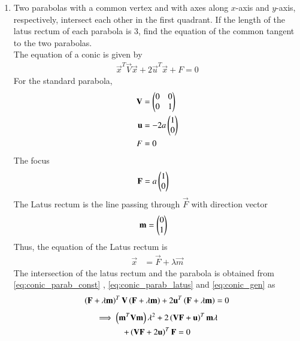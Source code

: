 \renewcommand{\theequation}{\theenumi}
\begin{enumerate}[label=\arabic*.,ref=\thesubsection.\theenumi]
\item Two parabolas with a common vertex and with axes along $x$-axis and $y$-axis, respectively, intersect 
each other in the first quadrant.  If the length of the latus rectum of each parabola is 3, find the equation 
of the common tangent to the two parabolas.
\\
\solution The equation of a conic is given by 
%
\begin{align}
\label{eq:conic_gen}
\vec{x}^T\vec{V}\vec{x}+2\vec{u}^T\vec{x}+F=0
\end{align}
%
For the standard parabola, 
\begin{align}
\label{eq:conic_parab_V}
\mathbf{V}&=\begin{pmatrix}0 & 0 \\ 0& 1\end{pmatrix}
\\
\mathbf{u}&=-2a\begin{pmatrix}1 \\ 0\end{pmatrix}
\label{eq:conic_parab_u}
\\
F&=0
\label{eq:conic_parab_const}
\end{align}
%
The focus
\begin{align}
\label{eq:conic_parab_focus}
\mathbf{F}&=a\begin{pmatrix}1 \\ 0\end{pmatrix}
\end{align}
%
The Latus rectum is the line passing through $\vec{F}$ with direction vector 
\begin{align}
\label{eq:conic_parab_latus_m}
\mathbf{m}&=\begin{pmatrix}0 \\ 1\end{pmatrix}
\end{align}
%
Thus, the equation of the Latus rectum is 
\begin{align}
\label{eq:conic_parab_latus}
\vec{x}&= \vec{F}+\lambda \vec{m}
\end{align}
%
The intersection of the latus rectum and the parabola is obtained from \eqref{eq:conic_parab_const}
, \eqref{eq:conic_parab_latus}
and \eqref{eq:conic_gen} as
\begin{align}
\left(\mathbf{F}+\lambda \mathbf{m}\right)^T\mathbf{V}\left(\mathbf{F}+\lambda \mathbf{m}\right)+2\mathbf{u}^T\left(\mathbf{F}+\lambda \mathbf{m}\right)=0
\end{align}
\begin{multline}
\label{eq:conic_parab_lam_quad}
\implies \left(\mathbf{m}^T\mathbf{V}\mathbf{m}\right)\lambda^2+2\left(\mathbf{V}\mathbf{F}+\mathbf{u}\right)^T\mathbf{m}\lambda 
\\
+\left(\mathbf{V}\mathbf{F}+2\mathbf{u}\right)^T\mathbf{F} = 0
\end{multline}

\end{enumerate}

